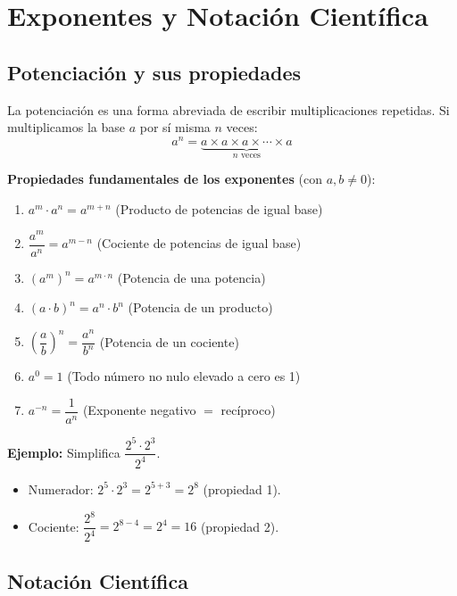 \documentclass[12pt, a4paper]{article}
\begin{document}
\newpage

\section{Exponentes y Notación Científica}

\subsection{Potenciación y sus propiedades}

La potenciación es una forma abreviada de escribir multiplicaciones repetidas. Si multiplicamos la base $a$ por sí misma $n$ veces:
$$a^n = \underbrace{a \times a \times a \times \cdots \times a}_{n \text{ veces}}$$

\begin{cuadroteoria}
\textbf{Propiedades fundamentales de los exponentes} (con $a, b \neq 0$):
\begin{enumerate}[leftmargin=*, label=\arabic*.]
  \item $a^m \cdot a^n = a^{m+n}$ \hfill (Producto de potencias de igual base)
  \item $\dfrac{a^m}{a^n} = a^{m-n}$ \hfill (Cociente de potencias de igual base)
  \item $(a^m)^n = a^{m \cdot n}$ \hfill (Potencia de una potencia)
  \item $(a \cdot b)^n = a^n \cdot b^n$ \hfill (Potencia de un producto)
  \item $\left(\dfrac{a}{b}\right)^n = \dfrac{a^n}{b^n}$ \hfill (Potencia de un cociente)
  \item $a^0 = 1$ \hfill (Todo número no nulo elevado a cero es 1)
  \item $a^{-n} = \dfrac{1}{a^n}$ \hfill (Exponente negativo $=$ recíproco)
\end{enumerate}
\end{cuadroteoria}

\noindent\textbf{Ejemplo:} Simplifica $\dfrac{2^5 \cdot 2^3}{2^4}$.
\begin{itemize}
  \item Numerador: $2^5 \cdot 2^3 = 2^{5+3} = 2^8$ (propiedad 1).
  \item Cociente: $\dfrac{2^8}{2^4} = 2^{8-4} = 2^4 = 16$ (propiedad 2).
\end{itemize}

\subsection{Notación Científica}
\end{document}
